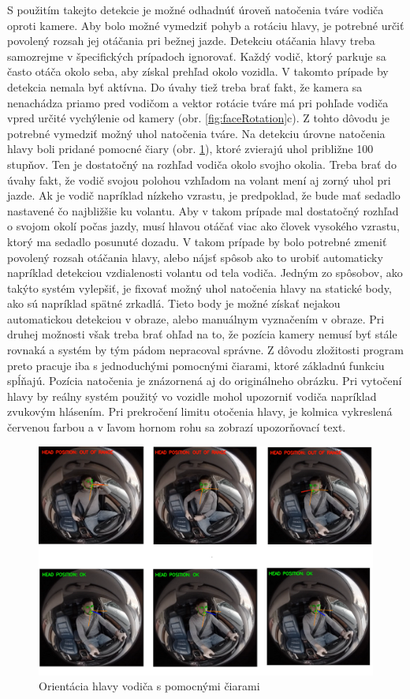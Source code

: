 \documentclass[slovak,master,dept460,male,cpp,cpdeclaration]{diploma}
\begin{document}
S použitím takejto detekcie je možné odhadnúť úroveň natočenia tváre vodiča oproti kamere. Aby bolo možné vymedziť pohyb a rotáciu hlavy, je potrebné určiť povolený rozsah jej otáčania pri bežnej jazde. Detekciu otáčania hlavy treba  samozrejme v špecifických prípadoch ignorovať. Každý vodič, ktorý parkuje sa často otáča okolo seba, aby získal prehľad okolo vozidla. V takomto prípade  by detekcia  nemala byť aktívna. Do úvahy tiež treba brať fakt, že kamera sa nenachádza priamo pred vodičom a vektor rotácie tváre má  pri pohľade vodiča vpred určité vychýlenie od kamery (obr. \ref{fig:faceRotation}c). Z tohto dôvodu je potrebné  vymedziť  možný uhol natočenia tváre. Na detekciu úrovne natočenia hlavy boli pridané  pomocné čiary (obr. \ref{fig:headLimits}), ktoré zvierajú uhol približne 100 stupňov. Ten je dostatočný na rozhľad vodiča okolo svojho okolia. Treba brať do úvahy fakt, že vodič svojou polohou vzhľadom na volant mení aj zorný uhol pri jazde. Ak je vodič napríklad nízkeho vzrastu, je predpoklad, že bude mať sedadlo nastavené čo najbližšie ku volantu. Aby v takom prípade mal dostatočný rozhľad o svojom okolí počas jazdy, musí hlavou otáčať viac ako človek vysokého vzrastu, ktorý ma sedadlo posunuté dozadu. V takom prípade by bolo potrebné zmeniť povolený rozsah otáčania hlavy, alebo nájsť spôsob ako to urobiť automaticky napríklad detekciou vzdialenosti volantu od tela vodiča. Jedným zo spôsobov, ako takýto systém vylepšiť, je fixovať možný uhol natočenia hlavy na statické body, ako sú napríklad spätné zrkadlá. Tieto body je možné získať nejakou automatickou detekciou v obraze, alebo manuálnym vyznačením v obraze. Pri druhej možnosti však treba brať ohľad na to, že pozícia kamery nemusí byť stále rovnaká a systém by tým pádom nepracoval správne. Z dôvodu zložitosti program preto pracuje iba s jednoduchými pomocnými čiarami, ktoré základnú funkciu  spĺňajú.  Pozícia natočenia  je znázornená aj do originálneho obrázku. Pri vytočení hlavy by reálny systém použitý vo vozidle mohol upozorniť vodiča napríklad zvukovým hlásením. Pri prekročení limitu otočenia hlavy, je kolmica vykreslená červenou farbou a v ľavom hornom rohu sa zobrazí upozorňovací text.

\begin{figure}[H]
	\centering
	\includegraphics[width=1\textwidth]{Figures/headLimits1.png}
	\caption{Orientácia hlavy vodiča s pomocnými čiarami}
	\label{fig:headLimits}
\end{figure}
\end{document}

